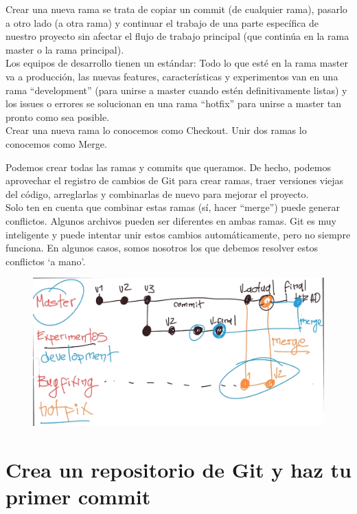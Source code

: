 \documentclass{article}
\begin{document}
Crear una nueva rama se trata de copiar un commit (de cualquier rama), pasarlo
a otro lado (a otra rama) y continuar el trabajo de una parte específica de
nuestro proyecto sin afectar el flujo de trabajo principal (que continúa en la
rama master o la rama principal).\\

Los equipos de desarrollo tienen un estándar: Todo lo que esté en la rama
master va a producción, las nuevas features, características y experimentos van
en una rama “development” (para unirse a master cuando estén definitivamente
listas) y los issues o errores se solucionan en una rama “hotfix” para unirse a
master tan pronto como sea posible.\\

Crear una nueva rama lo conocemos como Checkout. Unir dos ramas lo conocemos
como Merge.

Podemos crear todas las ramas y commits que queramos. De hecho, podemos
aprovechar el registro de cambios de Git para crear ramas, traer versiones
viejas del código, arreglarlas y combinarlas de nuevo para mejorar el proyecto.\\

Solo ten en cuenta que combinar estas ramas (sí, hacer “merge”) puede generar
conflictos. Algunos archivos pueden ser diferentes en ambas ramas. Git es muy
inteligente y puede intentar unir estos cambios automáticamente, pero no
siempre funciona. En algunos casos, somos nosotros los que debemos resolver
estos conflictos `a mano'.\\

\begin{figure}[h!]
  \centering
  \includegraphics[scale=0.4]{./Pictures/069_branches.png}
\end{figure}

\newpage

\section{Crea un repositorio de Git y haz tu primer commit}%
\end{document}
